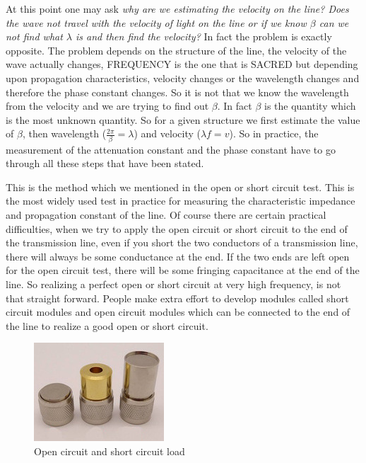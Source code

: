 At this point one may ask \emph{why are we estimating the velocity on the line? Does the wave not travel with the velocity of light on the line or if we know $\beta$ can we not find what $\lambda$ is and then find the velocity?} In fact the problem is exactly opposite. The problem depends on the structure of the line, the velocity of the wave actually changes, FREQUENCY is the one that is SACRED but depending upon propagation characteristics, velocity changes or the wavelength changes and therefore the phase constant changes. So it is not that we know the wavelength from the velocity and we are trying to find out $\beta$. In fact $\beta$ is the quantity which is the most unknown quantity. So for a given structure we first estimate the value of $\beta$, then wavelength ($\frac{2\pi}{\beta}= \lambda$) and velocity ($\lambda f = v$). So in practice, the measurement of the attenuation constant and the phase constant have to go through all these steps that have been stated.

This is the method which we mentioned in the open or short circuit test. This is the most widely used test in practice for measuring the characteristic impedance and propagation constant of the line. Of course there are certain practical difficulties, when we try to apply the open circuit or short circuit to the end of the transmission line, even if you short the two conductors of a transmission line, there will always be some conductance at the end. If the two ends are left open for the open circuit test, there will be some fringing capacitance at the end of the line. So realizing a perfect open or short circuit at very high frequency, is not that straight forward. People make extra effort to develop modules called short circuit modules and open circuit modules which can be connected to the end of the line to realize a good open or short circuit.
\begin{figure}[h]
\centering
\includegraphics[width=1\linewidth]{"./graphics/Short circuit load"}
\caption{Open circuit and short circuit load}
\end{figure}

